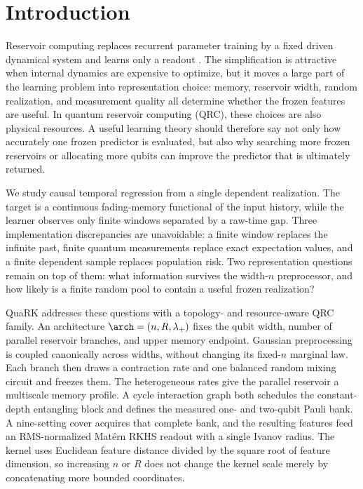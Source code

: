 \section{Introduction}
\label{sec:introduction}

Reservoir computing replaces recurrent parameter training by a fixed driven
dynamical system and learns only a readout
\citep{Jaeger2001,MaassNatschlagerMarkram2002}.  The simplification is
attractive when internal dynamics are expensive to optimize, but it moves a
large part of the learning problem into representation choice: memory,
reservoir width, random realization, and measurement quality all determine
whether the frozen features are useful.  In quantum reservoir computing
(QRC), these choices are also physical resources.  A useful learning theory
should therefore say not only how accurately one frozen predictor is evaluated,
but also why searching more frozen reservoirs or allocating more qubits can
improve the predictor that is ultimately returned.

We study causal temporal regression from a single dependent realization.  The
target is a continuous fading-memory functional of the input history, while
the learner observes only finite windows separated by a raw-time gap.  Three
implementation discrepancies are unavoidable: a finite window replaces the
infinite past, finite quantum measurements replace exact expectation values,
and a finite dependent sample replaces population risk.  Two representation
questions remain on top of them: what information survives the width-$n$
preprocessor, and how likely is a finite random pool to contain a useful frozen
realization?

QuaRK addresses these questions with a topology- and resource-aware QRC family.
An architecture $\arch=(n,R,\lambda_+)$ fixes the qubit width, number of
parallel reservoir branches, and upper memory endpoint.  Gaussian
preprocessing is coupled canonically across widths, without changing its
fixed-$n$ marginal law.  Each branch then draws a contraction rate and one
balanced random mixing circuit and freezes them.  The heterogeneous rates give
the parallel reservoir a multiscale memory profile.  A cycle interaction graph
both schedules the constant-depth entangling block and defines the measured
one- and two-qubit Pauli bank.  A nine-setting cover acquires that complete
bank, and the resulting features feed an RMS-normalized Mat\'ern RKHS readout
with a single Ivanov radius.  The kernel uses Euclidean feature distance divided
by the square root of feature dimension, so increasing $n$ or $R$ does not
change the kernel scale merely by concatenating more bounded coordinates.

